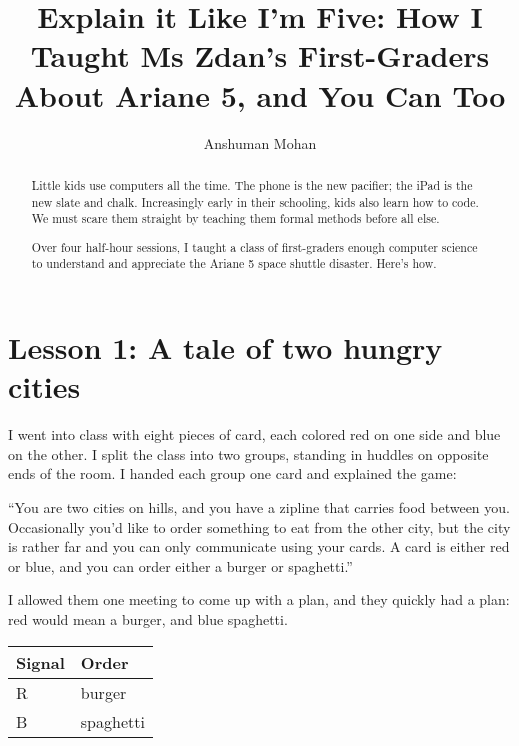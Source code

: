 \documentclass[sigplan,review]{acmart}
\begin{document}
\title[Explain it Like I'm Five]{Explain it Like I'm Five: How I Taught Ms Zdan's First-Graders About Ariane 5, and You Can Too}

\author{Anshuman Mohan}

\begin{abstract}

Little kids use computers all the time.
The phone is the new pacifier; the iPad is the new slate and chalk.
Increasingly early in their schooling, kids also learn how to code.
We must scare them straight by teaching them formal methods before all else.

Over four half-hour sessions, I taught a class of first-graders enough computer science to understand and appreciate the Ariane 5 space shuttle disaster.
Here's how.

\end{abstract}

\maketitle

\section*{Lesson 1: A tale of two hungry cities}

I went into class with eight pieces of card, each colored red on one side and blue on the other.
I split the class into two groups, standing in huddles on opposite ends of the room.
I handed each group one card and explained the game:

``You are two cities on hills, and you have a zipline that carries food between you.
Occasionally you'd like to order something to eat from the other city, but the city is rather far and you can only communicate using your cards.
A card is either red or blue, and you can order either a burger or spaghetti.''

I allowed them one meeting to come up with a plan, and they quickly had a plan: red would mean a burger, and blue spaghetti.

\begin{table}[h]\sffamily
  \begin{tabular}{ll}
  Signal & Order \\
  \midrule
  R & burger \\
  B & spaghetti \\
  \end{tabular}
\end{table}
\end{document}
